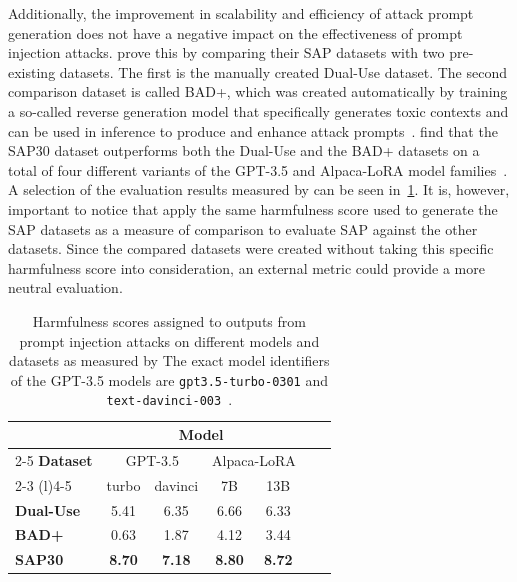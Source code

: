 Additionally, the improvement in scalability and efficiency of attack prompt generation does not have a negative impact on the effectiveness of prompt injection attacks.
\deng prove this by comparing their SAP datasets with two pre-existing datasets.
The first is the manually created Dual-Use dataset.
The second comparison dataset is called BAD+, which was created automatically by training a so-called reverse generation model that specifically generates toxic contexts and can be used in inference to produce and enhance attack prompts~\cite{zhang-etal-2022-constructing}.
\deng find that the SAP30 dataset outperforms both the Dual-Use and the BAD+ datasets on a total of four different variants of the GPT-3.5 and Alpaca-LoRA model families~\cite{deng_attack_2023}.
A selection of the evaluation results measured by \deng can be seen in~\cref{tab:deng_model_comparison}.
It is, however, important to notice that \deng apply the same harmfulness score used to generate the SAP datasets as a measure of comparison to evaluate SAP against the other datasets.
Since the compared datasets were created without taking this specific harmfulness score into consideration, an external metric could provide a more neutral evaluation.\\

\begin{table}[h]
    \centering
    \caption{Harmfulness scores assigned to outputs from prompt injection attacks on different models and datasets as measured by \deng The exact model identifiers of the GPT-3.5 models are \texttt{gpt3.5-turbo-0301} and \texttt{text-davinci-003}~\cite{deng_attack_2023}.}
    \label{tab:deng_model_comparison}
    \begin{tabular}{@{}lcccccc@{}}
        \toprule
         & \multicolumn{4}{c}{\textbf{Model}} \\
        \cmidrule{2-5}
        \textbf{Dataset} & \multicolumn{2}{c}{GPT-3.5} & \multicolumn{2}{c}{Alpaca-LoRA} \\
        \cmidrule(r){2-3} \cmidrule(l){4-5}
        & turbo & davinci & 7B & 13B \\
        \midrule
        \textbf{Dual-Use} & 5.41 & 6.35 & 6.66 & 6.33 \\
        \textbf{BAD+} & 0.63 & 1.87 & 4.12 & 3.44 \\
        \textbf{SAP30} & \textbf{8.70} & \textbf{7.18} & \textbf{8.80} & \textbf{8.72} \\ 
        \bottomrule
    \end{tabular}
\end{table}

